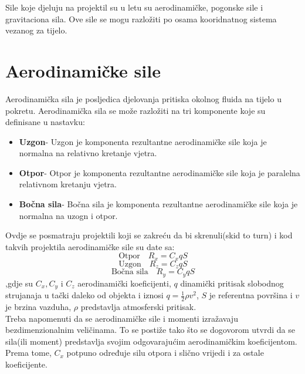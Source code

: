 
Sile koje djeluju na projektil su u letu su aerodinamičke, pogonske sile i 
gravitaciona sila. Ove sile se mogu razložiti po osama kooridnatnog sistema vezanog 
za tijelo. 
\section{Aerodinamičke sile}
Aerodinamička sila je posljedica djelovanja pritiska okolnog fluida na tijelo u pokretu. 
Aerodinamička sila se može razložiti na tri komponente koje su definisane u nastavku:
\begin{itemize}
    \item \textbf{Uzgon}- Uzgon je komponenta rezultantne aerodinamičke sile 
    koja je normalna na relativno kretanje vjetra.
    \item \textbf{Otpor}- Otpor je komponenta rezultantne aerodinamičke sile 
    koja je paralelna relativnom kretanju vjetra.
    \item \textbf{Bočna sila}- Bočna sila je komponenta rezultantne aerodinamičke sile 
    koja je normalna na uzogn i otpor. 
\end{itemize}
Ovdje se posmatraju projektili koji se zakreću da bi skrenuli(skid to turn) i 
kod takvih projektila aerodinamičke sile su date sa:
\begin{equation}
   \text{Otpor} \quad R_x=C_xqS
   \label{eq:a1}
\end{equation}
\begin{equation}
    \text{Uzgon} \quad R_z=C_zqS
    \label{eq:a2}
\end{equation}
\begin{equation}
    \text{Bočna sila} \quad R_y=C_yqS
    \label{eq:a3}
\end{equation}
,gdje su $C_x,C_y$ i $C_z$ aerodinamički koeficijenti, $q$ dinamički pritisak slobodnog strujanaja
u tački daleko od objekta i iznosi $q=\frac{1}{2}\rho v^2$, $S$ je referentna površina i 
$v$ je brzina vazduha, $\rho$ predstavlja atmosferski pritisak.
\\
Treba napomenuti da se aerodinamičke sile i momenti izražavaju bezdimenzionalnim veličinama. 
To se postiže tako što se dogovorom utvrdi da se sila(ili moment) predstavlja svojim odgovarajućim 
aerodinamičkim koeficijentom. Prema tome, $C_x$ potpuno određuje silu otpora i slično vrijedi i 
za ostale koeficijente. \\

